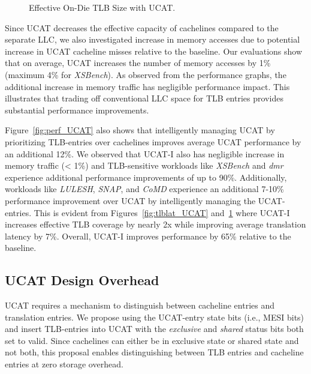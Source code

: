 \begin{figure}[tbh]
  \vspace{0.2in} \centering
  \centerline{}

  \caption{\small Effective On-Die TLB Size with UCAT.\normalsize}
  \label{fig:tlbsize_UCAT} 
  \vspace{-0.0 in}
\end{figure}

Since UCAT decreases the effective capacity of cachelines compared to
the separate LLC, we also investigated increase in memory accesses due
to potential increase in UCAT cacheline misses relative to the
baseline. Our evaluations show that on average, UCAT increases the
number of memory accesses by 1\% (maximum 4\% for {\em XSBench}). As
observed from the performance graphs, the additional increase in
memory traffic has negligible performance impact. This illustrates
that trading off conventional LLC space for TLB entries provides
substantial performance improvements.

Figure~\ref{fig:perf_UCAT} also shows that intelligently managing UCAT
by prioritizing TLB-entries over cachelines improves average UCAT
performance by an additional 12\%. We observed that UCAT-I also has
negligible increase in memory traffic (< 1\%) and TLB-sensitive
workloads like {\em XSBench} and {\em dmr} experience additional
performance improvements of up to 90\%. Additionally, workloads like
{\em LULESH}, {\em SNAP}, and {\em CoMD} experience an additional
7-10\% performance improvement over UCAT by intelligently managing the
UCAT-entries. This is evident from Figures~\ref{fig:tlblat_UCAT}
and~\ref{fig:tlbsize_UCAT} where UCAT-I increases effective TLB
coverage by nearly 2x while improving average translation latency by
7\%. Overall, UCAT-I improves performance by 65\% relative to the
baseline.

\subsection{UCAT Design Overhead}

\noindent UCAT requires a mechanism to distinguish between cacheline
entries and translation entries. We propose using the UCAT-entry state
bits (i.e., MESI bits) and insert TLB-entries into UCAT with the {\em
exclusive} and {\em shared} status bits both set to valid. Since
cachelines can either be in exclusive state or shared state and not
both, this proposal enables distinguishing between TLB entries and
cacheline entries at zero storage overhead. 

